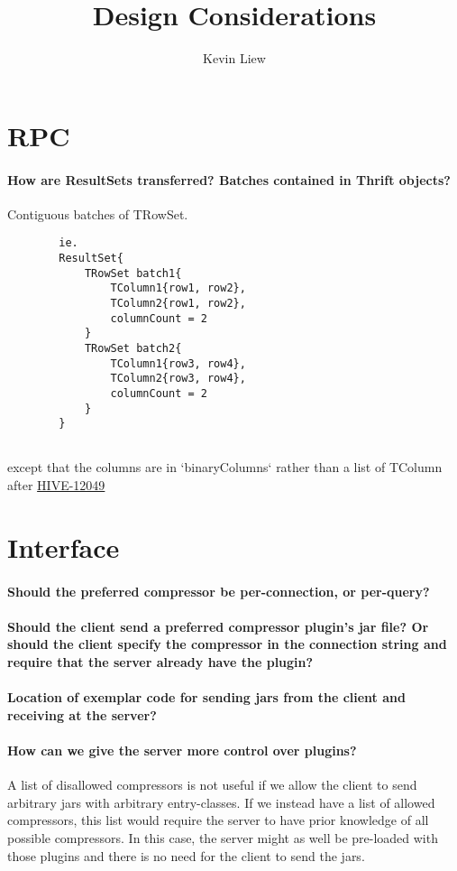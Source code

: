 \documentclass[11pt,a4paper]{article}
\title{Design Considerations}
\author{Kevin Liew}
\begin{document}
\maketitle

\section{RPC}
	\paragraph{How are ResultSets transferred? Batches contained in Thrift objects?}
	Contiguous batches of TRowSet.
	\begin{verbatim}
		ie.
		ResultSet{
		    TRowSet batch1{
		        TColumn1{row1, row2},
		        TColumn2{row1, row2},
		        columnCount = 2
		    }
		    TRowSet batch2{
		        TColumn1{row3, row4},
		        TColumn2{row3, row4},
		        columnCount = 2
		    }
		}
		
	\end{verbatim}
	except that the columns are in `binaryColumns` rather than a list of TColumn after \href{https://issues.apache.org/jira/browse/HIVE-12049}{HIVE-12049}

\section{Interface}
	\paragraph{Should the preferred compressor be per-connection, or per-query?}

	\paragraph{Should the client send a preferred compressor plugin's jar file? Or should the client specify the compressor in the connection string and require that the server already have the plugin?}
		
	\paragraph{Location of exemplar code for sending jars from the client and receiving at the server?}
	
	\paragraph{How can we give the server more control over plugins?}
	A list of disallowed compressors is not useful if we allow the client to send arbitrary jars with arbitrary entry-classes. If we instead have a list of allowed compressors, this list would require the server to have prior knowledge of all possible compressors. In this case, the server might as well be pre-loaded with those plugins and there is no need for the client to send the jars.
\end{document}
